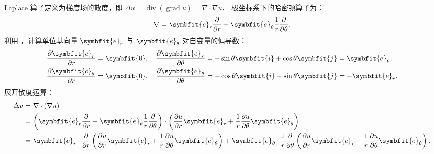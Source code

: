 \begin{solution}
    Laplace 算子定义为梯度场的散度，即 $\Delta u = \operatorname{div}(\operatorname{grad} u) = \nabla \cdot \nabla u$．
    极坐标系下的哈密顿算子为：
    \begin{equation}
        \nabla = \symbfit{e}_r \frac{\partial}{\partial r} + \symbfit{e}_\theta \frac{1}{r} \frac{\partial}{\partial \theta}.
    \end{equation}
    利用 ，计算单位基向量 $\symbfit{e}_r$ 与 $\symbfit{e}_\theta$ 对自变量的偏导数：
    \begin{equation}
        \label{eq:unit-deriv-8}
        \begin{aligned}
            \frac{\partial \symbfit{e}_r}{\partial r}      & = \symbfit{0}, \quad \frac{\partial \symbfit{e}_r}{\partial \theta} = -\sin\theta \symbfit{i} + \cos\theta \symbfit{j} = \symbfit{e}_\theta,  \\
            \frac{\partial \symbfit{e}_\theta}{\partial r} & = \symbfit{0}, \quad \frac{\partial \symbfit{e}_\theta}{\partial \theta} = -\cos\theta \symbfit{i} - \sin\theta \symbfit{j} = -\symbfit{e}_r.
        \end{aligned}
    \end{equation}
    展开散度运算：
    \begin{equation}
        \label{eq:laplace-expansion}
        \begin{aligned}
            \Delta u & = \nabla \cdot (\nabla u)                                                                                                                                                                                                                                                                                                                                                                \\
                     & = \left( \symbfit{e}_r \frac{\partial}{\partial r} + \symbfit{e}_\theta \frac{1}{r} \frac{\partial}{\partial \theta} \right) \cdot \left( \frac{\partial u}{\partial r} \symbfit{e}_r + \frac{1}{r} \frac{\partial u}{\partial \theta} \symbfit{e}_\theta \right)                                                                                                                        \\
                     & = \symbfit{e}_r \cdot \frac{\partial}{\partial r} \left( \frac{\partial u}{\partial r} \symbfit{e}_r + \frac{1}{r} \frac{\partial u}{\partial \theta} \symbfit{e}_\theta \right) + \symbfit{e}_\theta \cdot \frac{1}{r} \frac{\partial}{\partial \theta} \left( \frac{\partial u}{\partial r} \symbfit{e}_r + \frac{1}{r} \frac{\partial u}{\partial \theta} \symbfit{e}_\theta \right).

\end{aligned}
\end{equation}
\end{solution}
